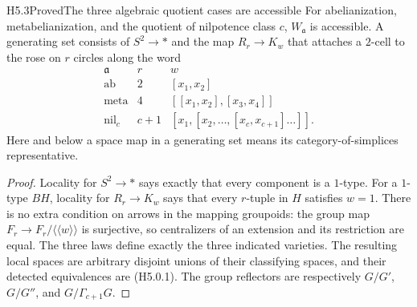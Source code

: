 \begin{claim}{H5.3}{Proved}{The three algebraic quotient cases are accessible}
For abelianization, metabelianization, and the quotient of
nilpotence class $c$, $W_{\mathfrak a}$ is accessible.
A generating set consists of $S^2\to *$ and the map
$R_r\to K_w$ that attaches a $2$-cell to the rose on $r$
circles along the word
\[
 \begin{array}{c|c|c}
 \mathfrak a&r&w\\ \hline
 \mathrm{ab}&2&[x_1,x_2]\\
 \mathrm{meta}&4&[[x_1,x_2],[x_3,x_4]]\\
 \mathrm{nil}_c&c+1&[x_1,[x_2,\ldots,[x_c,x_{c+1}]\ldots]] .
 \end{array}                                            \tag{H5.3.1}
\]
Here and below a space map in a generating set means its
category-of-simplices representative.
\end{claim}
\begin{proof}
Locality for $S^2\to *$ says exactly that every component is a
$1$-type. For a $1$-type $BH$, locality for $R_r\to K_w$ says
that every $r$-tuple in $H$ satisfies $w=1$. There is no extra
condition on arrows in the mapping groupoids: the group map
$F_r\to F_r/\langle\!\langle w\rangle\!\rangle$ is surjective,
so centralizers of an extension and its restriction are equal.
The three laws define exactly the three indicated varieties.
The resulting local spaces are arbitrary disjoint unions of
their classifying spaces, and their detected equivalences are
(H5.0.1). The group reflectors are respectively $G/G'$,
$G/G''$, and $G/\Gamma_{c+1}G$.
\end{proof}

